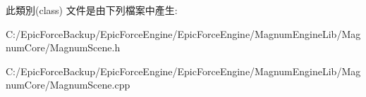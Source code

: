 此類別(class) 文件是由下列檔案中產生\+:\begin{DoxyCompactItemize}
\item 
C\+:/\+Epic\+Force\+Backup/\+Epic\+Force\+Engine/\+Epic\+Force\+Engine/\+Magnum\+Engine\+Lib/\+Magnum\+Core/Magnum\+Scene.\+h\item 
C\+:/\+Epic\+Force\+Backup/\+Epic\+Force\+Engine/\+Epic\+Force\+Engine/\+Magnum\+Engine\+Lib/\+Magnum\+Core/Magnum\+Scene.\+cpp\end{DoxyCompactItemize}
